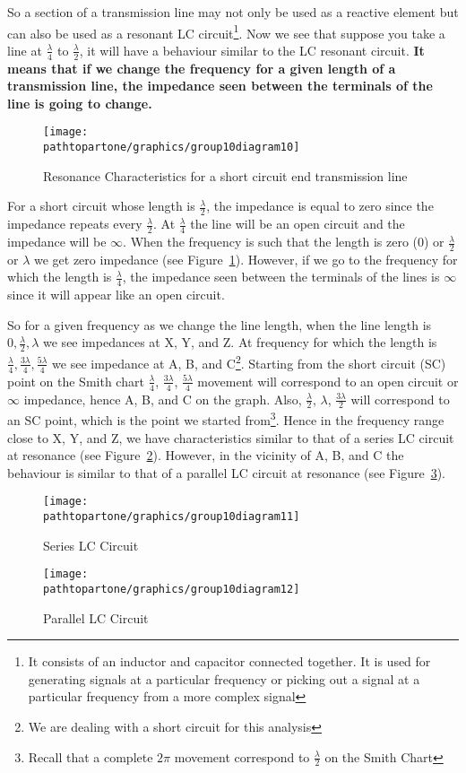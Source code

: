 So a section of a transmission line may not only be used as a reactive element but can also be used as a resonant LC circuit\footnote{
It consists of an inductor and capacitor connected together. It is used for generating signals at a particular frequency or picking out a signal at a particular frequency from a more complex signal
}. Now we see that suppose you take a line at $ \frac{\lambda}{4} $ to $ \frac{\lambda}{2} $, it will have a behaviour similar to the LC resonant circuit. \textbf{It means that if we change the frequency for a given length of a transmission line, the impedance seen between the terminals of the line is going to change.}
\begin{figure}[h]
\centering
\texttt{[image: \\pathtopartone/graphics/group10diagram10]}
\caption{Resonance Characteristics for a short circuit end transmission line}
\label{fig:group10diagram11}
\end{figure}

For a short circuit whose length is $ \frac{\lambda}{2} $, the impedance is equal to zero since the impedance repeats every $\frac{\lambda}{2}$. At $ \frac{\lambda}{4} $ the line will be an open circuit and the impedance will be $\infty$. When the frequency is such that the length is zero (0) or $ \frac{\lambda}{2} $ or $ \lambda $ we get zero impedance (see Figure~\ref{fig:group10diagram11}). However, if we go to the frequency for which the length is $ \frac{\lambda}{4} $, the impedance seen between the terminals of the lines is $\infty$ since it will appear like an open circuit.

So for a given frequency as we change the line length, when the line length is $ 0, \frac{\lambda}{2}, \lambda $ we see impedances at X, Y, and Z. At frequency for which the length is $ \frac{\lambda}{4}, \frac{3\lambda}{4}, \frac{5\lambda}{4} $ we see impedance at A, B, and C\footnote{
We are dealing with a short circuit for this analysis
}. Starting from the short circuit (SC) point on the Smith chart $ \frac{\lambda}{4} $, $ \frac{3\lambda}{4} $, $ \frac{5\lambda}{4} $ movement will correspond to an open circuit or $ \infty $ impedance, hence A, B, and C on the graph. Also, $ \frac{\lambda}{2} $, $ \lambda $, $ \frac{3\lambda}{2} $ will correspond to an SC point, which is the point we started from\footnote{
Recall that a complete $ 2\pi $ movement correspond to $ \frac{\lambda}{2} $ on the Smith Chart
}. Hence in the frequency range close to X, Y, and Z, we have characteristics similar to that of a series LC circuit
at resonance (see Figure~\ref{fig:group10diagram12}). However, in the vicinity of A, B, and C the behaviour is similar to that of a parallel LC circuit at resonance (see Figure~\ref{fig:group10diagram13}). 
\begin{figure}[h]
\centering
\texttt{[image: \\pathtopartone/graphics/group10diagram11]}
\caption{Series LC Circuit}
\label{fig:group10diagram12}
\end{figure}
\begin{figure}[h]
\centering
\texttt{[image: \\pathtopartone/graphics/group10diagram12]}
\caption{Parallel LC Circuit}
\label{fig:group10diagram13}
\end{figure}

